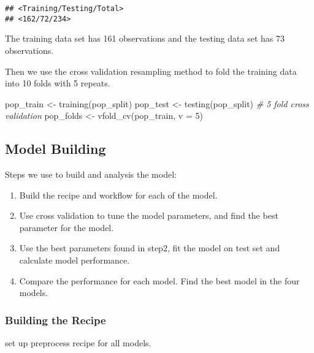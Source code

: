 \documentclass[
]{article}
\newenvironment{Shaded}{\begin{snugshade}}{\end{snugshade}}
\newcommand{\AttributeTok}[1]{\textcolor[rgb]{0.77,0.63,0.00}{#1}}
\newcommand{\CommentTok}[1]{\textcolor[rgb]{0.56,0.35,0.01}{\textit{#1}}}
\newcommand{\DecValTok}[1]{\textcolor[rgb]{0.00,0.00,0.81}{#1}}
\newcommand{\FunctionTok}[1]{\textcolor[rgb]{0.00,0.00,0.00}{#1}}
\newcommand{\NormalTok}[1]{#1}
\newcommand{\OtherTok}[1]{\textcolor[rgb]{0.56,0.35,0.01}{#1}}
\begin{document}
\begin{verbatim}
## <Training/Testing/Total>
## <162/72/234>
\end{verbatim}

The training data set has 161 observations and the testing data set has
73 observations.

Then we use the cross validation resampling method to fold the training
data into 10 folds with 5 repeats.

\begin{Shaded}
\begin{Highlighting}[]
\NormalTok{pop\_train }\OtherTok{\textless{}{-}} \FunctionTok{training}\NormalTok{(pop\_split)}
\NormalTok{pop\_test }\OtherTok{\textless{}{-}} \FunctionTok{testing}\NormalTok{(pop\_split)}
\CommentTok{\# 5 fold cross validation}
\NormalTok{pop\_folds }\OtherTok{\textless{}{-}} \FunctionTok{vfold\_cv}\NormalTok{(pop\_train, }\AttributeTok{v =} \DecValTok{5}\NormalTok{)}
\end{Highlighting}
\end{Shaded}

\hypertarget{model-building}{%
\subsection{Model Building}\label{model-building}}

Steps we use to build and analysis the model:

\begin{enumerate}
\def\labelenumi{\arabic{enumi}.}
\item
  Build the recipe and workflow for each of the model.
\item
  Use cross validation to tune the model parameters, and find the best
  parameter for the model.
\item
  Use the best parameters found in step2, fit the model on test set and
  calculate model performance.
\item
  Compare the performance for each model. Find the best model in the
  four models.
\end{enumerate}

\hypertarget{building-the-recipe}{%
\subsubsection{Building the Recipe}\label{building-the-recipe}}

set up preprocess recipe for all models.
\end{document}
